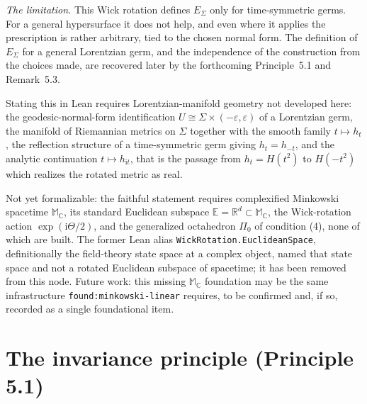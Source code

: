\begin{definition}
  \emph{The limitation.} This Wick rotation defines $E_{\Sigma}$ only for
  time-symmetric germs. For a general hypersurface it does not help, and even where
  it applies the prescription is rather arbitrary, tied to the chosen normal form.
  The definition of $E_{\Sigma}$ for a general Lorentzian germ, and the independence
  of the construction from the choices made, are recovered later by the forthcoming
  Principle~5.1 and Remark~5.3.

  Stating this in Lean requires Lorentzian-manifold geometry not developed here:
  the geodesic-normal-form identification
  $U \cong \Sigma \times (-\varepsilon, \varepsilon)$ of a Lorentzian germ, the
  manifold of Riemannian metrics on $\Sigma$ together with the smooth family
  $t \mapsto h_t$, the reflection structure of a time-symmetric germ giving
  $h_t = h_{-t}$, and the analytic continuation $t \mapsto h_{\mathrm{i}t}$, that is
  the passage from $h_t = H(t^2)$ to $H(-t^2)$ which realizes the rotated metric as
  real.

  Not yet formalizable: the faithful statement requires complexified Minkowski
  spacetime $\mathbb M_{\mathbb C}$, its standard Euclidean subspace
  $\mathbb E = \mathbb R^d \subset \mathbb M_{\mathbb C}$, the Wick-rotation action
  $\exp(\mathrm i\Theta/2)$, and the generalized octahedron $\Pi_0$ of condition (4),
  none of which are built. The former Lean alias \texttt{WickRotation.EuclideanSpace},
  definitionally the field-theory state space at a complex object, named that state
  space and not a rotated Euclidean subspace of spacetime; it has been removed from
  this node. Future work: this missing $\mathbb M_{\mathbb C}$ foundation may be the
  same infrastructure \texttt{found:minkowski-linear} requires, to be confirmed and,
  if so, recorded as a single foundational item.
\end{definition}

\section{The invariance principle (Principle 5.1)}

